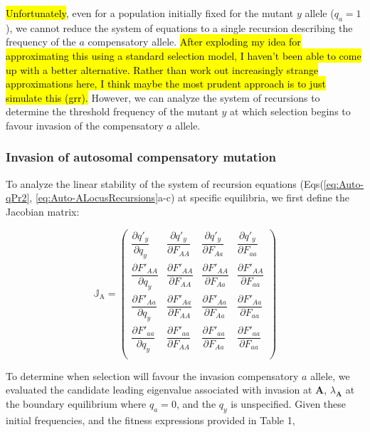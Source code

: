 \documentclass{article}
\begin{document}
\hl{Unfortunately}, even for a population initially fixed for the mutant $y$ allele ($q_a = 1$), we cannot reduce the system of equations to a single recursion describing the frequency of the $a$ compensatory allele. \hl{After exploding my idea for approximating this using a standard selection model, I haven't been able to come up with a better alternative. Rather than work out increasingly strange approximations here, I think maybe the most prudent approach is to just simulate this (grr).} However, we can analyze the system of recursions to determine the threshold frequency of the mutant $y$ at which selection begins to favour invasion of the compensatory $a$ allele.

\subsubsection{Invasion of autosomal compensatory mutation}

To analyze the linear stability of the system of recursion equations (Eqs(\ref{eq:Auto-qPr2}, \ref{eq:Auto-ALocusRecursions}a-c) at specific equilibria, we first define the Jacobian matrix:

\begin{equation}
	\mathbb{J}_{\text{A}} = \left( \begin{array}{cccc} 
		\dfrac{\partial  q'_y}{\partial q_y} & \dfrac{\partial  q'_y}{\partial F_{AA}} & \dfrac{\partial  q'_y}{\partial F_{Aa}} & \dfrac{\partial  q'_y}{\partial F_{aa}} \\ 
		\dfrac{\partial  F'_{AA}}{\partial q_y} & \dfrac{\partial  F'_{AA}}{\partial F_{AA}} & \dfrac{\partial  F'_{AA}}{\partial F_{Aa}} & \dfrac{\partial  F'_{AA}}{\partial F_{aa}} \\ 
		\dfrac{\partial  F'_{Aa}}{\partial q_y} & \dfrac{\partial  F'_{Aa}}{\partial F_{AA}} & \dfrac{\partial  F'_{Aa}}{\partial F_{Aa}} & \dfrac{\partial  F'_{Aa}}{\partial F_{aa}} \\ 
		\dfrac{\partial  F'_{aa}}{\partial q_y} & \dfrac{\partial  F'_{aa}}{\partial F_{AA}} & \dfrac{\partial  F'_{aa}}{\partial F_{Aa}} & \dfrac{\partial  F'_{aa}}{\partial F_{aa}} \\ 
	\end{array} \right)
\end{equation}

\noindent To determine when selection will favour the invasion compensatory $a$ allele, we evaluated the candidate leading eigenvalue associated with invasion at $\mathbf{A}$, $\lambda_{\mathbf{A}}$ at the boundary equilibrium where $q_a = 0$, and the $q_y$ is unspecified. Given these initial frequencies, and the fitness expressions provided in Table 1,
\end{document}
